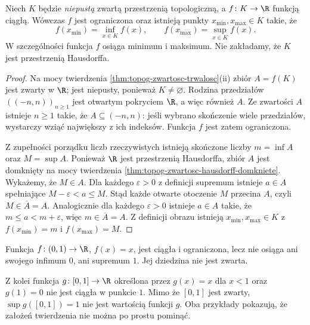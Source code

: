 \begin{twierdzenie}
\label{thm:topog-weierstrass-kresy}
Niech $K$ będzie \emph{niepustą} zwartą przestrzenią
topologiczną, a $f\colon K\to\R$ funkcją ciągłą.
Wówczas $f$ jest ograniczona oraz istnieją punkty
$x_{\min},x_{\max}\in K$ takie, że
\[
 f(x_{\min})=\inf_{x\in K} f(x),\qquad
 f(x_{\max})=\sup_{x\in K} f(x).
\]
W szczególności funkcja $f$ osiąga minimum i maksimum.
Nie zakładamy, że $K$ jest przestrzenią Hausdorffa.
\end{twierdzenie}
\begin{proof}
Na mocy twierdzenia \ref{thm:topog-zwartosc-trwalosc}(ii)
zbiór $A=f(K)$ jest zwarty w $\R$; jest niepusty,
ponieważ $K\ne\varnothing$. Rodzina przedziałów
$((-n,n))_{n\ge1}$ jest otwartym pokryciem $\R$,
a więc również $A$. Ze zwartości $A$ istnieje
$n\ge1$ takie, że $A\subseteq(-n,n)$: jeśli wybrano
skończenie wiele przedziałów, wystarczy wziąć
największy z ich indeksów. Funkcja $f$ jest zatem
ograniczona.

Z zupełności porządku liczb rzeczywistych istnieją
skończone liczby $m=\inf A$ oraz $M=\sup A$.
Ponieważ $\R$ jest przestrzenią Hausdorffa, zbiór
$A$ jest domknięty na mocy twierdzenia
\ref{thm:topog-zwartosc-hausdorff-domkniete}.
Wykażemy, że $M\in A$. Dla każdego $\varepsilon>0$
z definicji supremum istnieje $a\in A$ spełniające
$M-\varepsilon<a\le M$. Stąd każde otwarte otoczenie
$M$ przecina $A$, czyli $M\in\overline A=A$.
Analogicznie dla każdego $\varepsilon>0$ istnieje
$a\in A$ takie, że $m\le a<m+\varepsilon$,
więc $m\in\overline A=A$. Z definicji obrazu
istnieją $x_{\min},x_{\max}\in K$ z
$f(x_{\min})=m$ i $f(x_{\max})=M$.
\end{proof}

\begin{przyklad}
\label{ex:topog-weierstrass-zalozenia}
Funkcja $f\colon(0,1)\to\R$, $f(x)=x$, jest ciągła
i ograniczona, lecz nie osiąga ani swojego infimum $0$,
ani supremum $1$. Jej dziedzina nie jest zwarta.

Z kolei funkcja $g\colon[0,1]\to\R$ określona przez
$g(x)=x$ dla $x<1$ oraz $g(1)=0$ nie jest ciągła
w punkcie $1$. Mimo że $[0,1]$ jest zwarty,
$\sup g([0,1])=1$ nie jest wartością funkcji $g$.
Oba przykłady pokazują, że założeń twierdzenia
nie można po prostu pominąć.
\end{przyklad}

